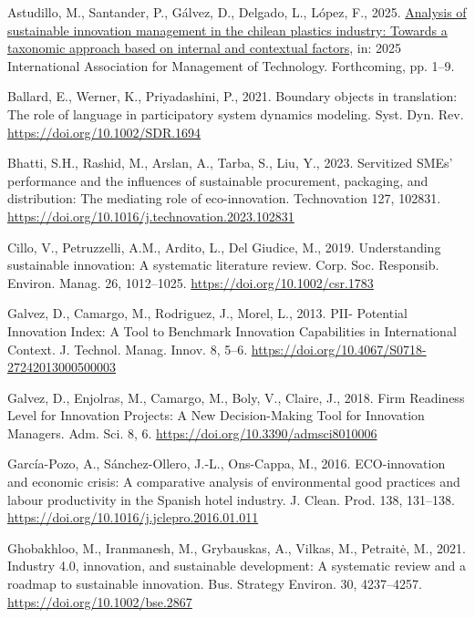 \documentclass[
  12pt,
  oneside]{book}
\newlength{\cslhangindent}
\newenvironment{CSLReferences}[2] %
 {\begin{list}{}{%
  \setlength{\itemindent}{0pt}
  \setlength{\leftmargin}{0pt}
  \setlength{\parsep}{0pt}
  \ifodd #1
   \setlength{\leftmargin}{\cslhangindent}
   \setlength{\itemindent}{-1\cslhangindent}
  \fi
  \setlength{\itemsep}{#2\baselineskip}}}
 {\end{list}}
\begin{document}
\protect{}\label{refs}
\begin{CSLReferences}{1}{0}
Astudillo, M., Santander, P., Gálvez, D., Delgado, L., López, F., 2025.
\href{https://www.iamot.net/}{Analysis of sustainable innovation
management in the chilean plastics industry: Towards a taxonomic
approach based on internal and contextual factors}, in: 2025
International Association for Management of Technology. Forthcoming, pp.
1--9.

Ballard, E., Werner, K., Priyadashini, P., 2021. Boundary objects in
translation: The role of language in participatory system dynamics
modeling. Syst. Dyn. Rev. \url{https://doi.org/10.1002/SDR.1694}

Bhatti, S.H., Rashid, M., Arslan, A., Tarba, S., Liu, Y., 2023.
Servitized {SMEs}' performance and the influences of sustainable
procurement, packaging, and distribution: {The} mediating role of
eco-innovation. Technovation 127, 102831.
\url{https://doi.org/10.1016/j.technovation.2023.102831}

Cillo, V., Petruzzelli, A.M., Ardito, L., Del Giudice, M., 2019.
Understanding sustainable innovation: {A} systematic literature review.
Corp. Soc. Responsib. Environ. Manag. 26, 1012--1025.
\url{https://doi.org/10.1002/csr.1783}

Galvez, D., Camargo, M., Rodriguez, J., Morel, L., 2013. {PII}-
{Potential Innovation Index}: A {Tool} to {Benchmark Innovation
Capabilities} in {International Context}. J. Technol. Manag. Innov. 8,
5--6. \url{https://doi.org/10.4067/S0718-27242013000500003}

Galvez, D., Enjolras, M., Camargo, M., Boly, V., Claire, J., 2018. Firm
{Readiness Level} for {Innovation Projects}: {A New Decision-Making
Tool} for {Innovation Managers}. Adm. Sci. 8, 6.
\url{https://doi.org/10.3390/admsci8010006}

García-Pozo, A., Sánchez-Ollero, J.-L., Ons-Cappa, M., 2016.
{ECO}-innovation and economic crisis: A comparative analysis of
environmental good practices and labour productivity in the {Spanish}
hotel industry. J. Clean. Prod. 138, 131--138.
\url{https://doi.org/10.1016/j.jclepro.2016.01.011}

Ghobakhloo, M., Iranmanesh, M., Grybauskas, A., Vilkas, M., Petraitė,
M., 2021. Industry 4.0, innovation, and sustainable development: {A}
systematic review and a roadmap to sustainable innovation. Bus. Strategy
Environ. 30, 4237--4257. \url{https://doi.org/10.1002/bse.2867}


\end{CSLReferences}
\end{document}

